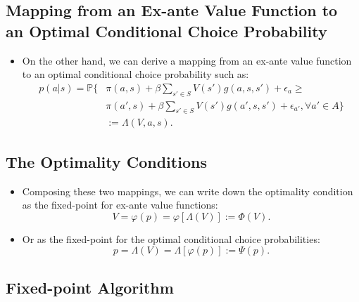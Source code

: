 \documentclass[
]{book}
\providecommand{\tightlist}{%
  \setlength{\itemsep}{0pt}\setlength{\parskip}{0pt}}
\begin{document}
\hypertarget{mapping-from-an-ex-ante-value-function-to-an-optimal-conditional-choice-probability}{%
\subsection{Mapping from an Ex-ante Value Function to an Optimal Conditional Choice Probability}\label{mapping-from-an-ex-ante-value-function-to-an-optimal-conditional-choice-probability}}

\begin{itemize}
\tightlist
\item
  On the other hand, we can derive a mapping from an ex-ante value function to an optimal conditional choice probability such as:
  \begin{equation}
  \begin{split}
  p(a|s) = \mathbb{P}\Bigg\{&\pi(a , s) + \beta \sum_{s' \in S} V(s') g(a, s, s') + \epsilon_a \ge\\
  &\pi(a' , s) + \beta \sum_{s' \in S} V(s') g(a', s, s') + \epsilon_{a'}, \forall a' \in A \Bigg\}\\
  &:= \Lambda(V, a, s).
  \end{split}
  \end{equation}
\end{itemize}

\hypertarget{the-optimality-conditions}{%
\subsection{The Optimality Conditions}\label{the-optimality-conditions}}

\begin{itemize}
\tightlist
\item
  Composing these two mappings, we can write down the optimality condition as the fixed-point for ex-ante value functions:
  \begin{equation}
  V = \varphi(p) = \varphi[\Lambda(V)] := \Phi(V).
  \end{equation}
\item
  Or as the fixed-point for the optimal conditional choice probabilities:
  \[
  p = \Lambda(V) = \Lambda[\varphi(p)] := \Psi(p).
  \]
\end{itemize}

\hypertarget{fixed-point-algorithm}{%
\subsection{Fixed-point Algorithm}\label{fixed-point-algorithm}}
\end{document}
